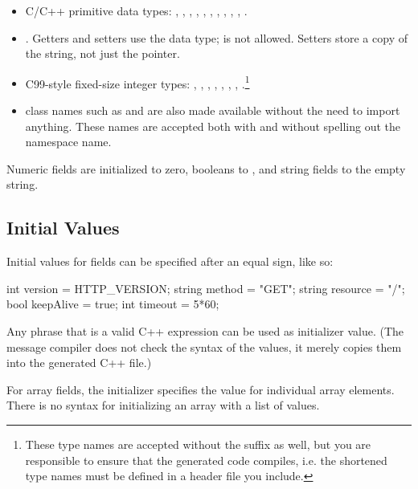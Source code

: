 \begin{itemize}
  \item C/C++ primitive data types: , ,
    , , , ,
    , , , , .
  \item {}. Getters and setters use the  data
    type;  is not allowed. Setters store a copy of the string, not
    just the pointer.
  \item C99-style fixed-size integer types: ,
    , , ,
    , , ,
    .\footnote{These type names are accepted without the
     suffix as well, but you are responsible to ensure that the
    generated code compiles, i.e. the shortened type names must be defined in a
    header file you include.}
  \item {\opp} class names such as  and  are
    also made available without the need to import anything. These names are
    accepted both with and without spelling out the  namespace
    name.
\end{itemize}

Numeric fields are initialized to zero, booleans to , and string
fields to the empty string.


\subsection{Initial Values}
\label{sec:msg-defs:initial-values}

Initial values for fields can be specified after an equal sign, like so:

\begin{msg}
int version = HTTP_VERSION;
string method = "GET";
string resource = "/";
bool keepAlive = true;
int timeout = 5*60;
\end{msg}

Any phrase that is a valid C++ expression can be used as initializer value. (The
message compiler does not check the syntax of the values, it merely copies them
into the generated C++ file.)

For array fields, the initializer specifies the value for individual array
elements. There is no syntax for initializing an array with a list of values.


